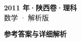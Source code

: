 \documentclass[zihao=-4, a4paper]{ctexart}
\begin{document}
\begin{center}
  {\Large\bfseries 2011 年·陕西卷·理科}\\[4pt]
  {\large 数学 · 解析版}
\end{center}
\medskip
{}

\clearpage
{}
\begin{center}{\Large\bfseries 参考答案与详细解析}\end{center}
\medskip

\end{document}
